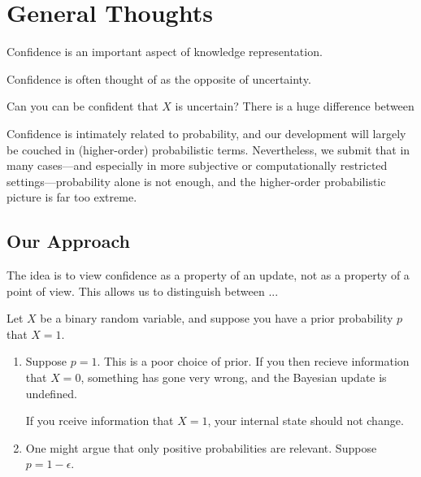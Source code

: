 \documentclass{article}
\begin{document}
    
    


    
\section{General Thoughts}
Confidence is an important aspect of knowledge representation.

Confidence is often thought of as the opposite of uncertainty.

Can you can be confident that $X$ is uncertain?
There is a huge difference between 



Confidence is intimately related to probability, and our development will largely be couched in (higher-order) probabilistic terms.
Nevertheless, we submit that in many cases---and especially in more subjective or computationally restricted settings---probability alone is not enough, and the higher-order probabilistic picture is far too extreme.



\subsection*{Our Approach}
The idea is to view confidence as a property of an update, not as a property of a point of view. 
This allows us to distinguish between ...

\begin{example}
Let $X$ be a binary random variable, and suppose you have a prior probability $p$ that $X=1$.
\begin{enumerate}
    \item Suppose $p=1$. 
    This is a poor choice of prior. 
    If you then recieve information that $X=0$, something has gone very wrong, and the Bayesian update is undefined.
    
    If you rceive information that $X = 1$, your internal state should not change. 
    
    \item One might argue that only positive probabilities are relevant.
    Suppose $p = 1 - \epsilon$.
\end{enumerate}
\end{example}
\end{document}
